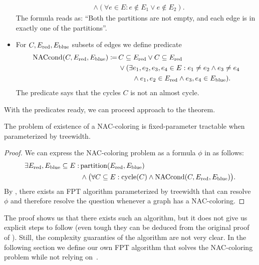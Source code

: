 \begin{itemize}
\begin{align*}
		                                              & \land (\forall e \in E : e \not\in E_1 \lor e \not\in E_2 ).
	      \end{align*}
	      The formula reads as: ``Both the partitions are not empty,
	      and each edge is in exactly one of the partitions''.
	\item For \( C, E_{\text{red}}, E_{\text{blue}} \) subsets of edges we define predicate
	      \begin{align*}
		      \text{NACcond}(C, E_{\text{red}}, E_{\text{blue}}) \coloneqq \,
		       & C \subseteq E_{\text{red}} \lor C \subseteq E_{\text{red}}
		      \\
		       & \lor (\exists e_1, e_2, e_3, e_4 \in E :
		      e_1 \ne e_2 \land e_3 \ne e_4
		      \\
		       & \qquad \land e_1, e_2 \in E_{\text{red}} \land e_3, e_4 \in E_{\text{blue}} ).
	      \end{align*}
	      The predicate says that the cycles \( C \) is not an almost cycle.
\end{itemize}
%

With the predicates ready, we can proceed approach to the theorem.
%
\begin{theorem}
	The problem of existence of a NAC-coloring is fixed-parameter
	tractable when parameterized by treewidth.
\end{theorem}
%
\begin{proof}
	We can express the NAC-coloring problem
	as a formula \( \phi \) in \MSO{} as follows:
	\begin{align*}
		\exists E_{\text{red}}, E_{\text{blue}} \subseteq E : \,
		 & \text{partition}(E_{\text{red}}, E_{\text{blue}})                                                                 \\
		 & \land \big(\forall C \subseteq E : \text{cycle}(C) \land \text{NACcond}(C, E_{\text{red}}, E_{\text{blue}}) \big)
		.
	\end{align*}
	By ,
	there exists an FPT algorithm parameterized by treewidth
	that can resolve \( \phi \) and therefore resolve the question whenever a graph has a NAC-coloring.
\end{proof}
%
The proof shows us that there exists such an algorithm,
but it does not give us explicit steps to follow
(even tough they can be deduced from the original proof of ).
Still, the complexity guaranties of the algorithm are not very clear.
In the following section we define our
own FPT algorithm that solves the NAC-coloring problem
while not relying on~\MSO{}.



